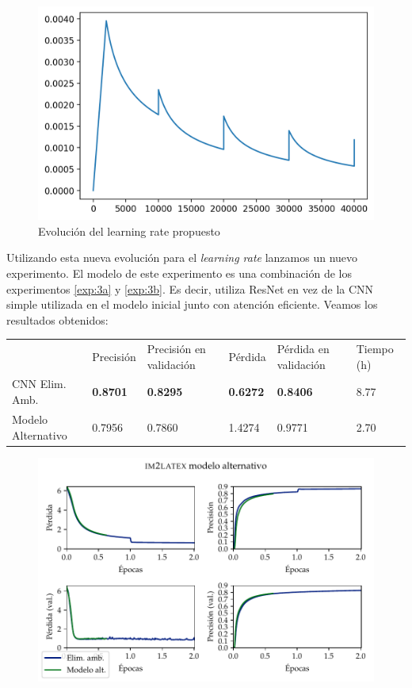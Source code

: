 \documentclass[a4paper, 20pt, dvipsnames]{article}
\begin{document}
\begin{figure}[H]
	\centering
	\includegraphics[scale=0.5]{fig/learning-rate2}
	\caption{Evolución del learning rate propuesto}
\end{figure}

Utilizando esta nueva evolución para el \emph{learning rate} lanzamos un nuevo
experimento. El modelo de este experimento es una combinación de los experimentos
\ref{exp:3a} y \ref{exp:3b}. Es decir, utiliza ResNet en vez de la CNN simple
utilizada en el modelo inicial junto con atención eficiente. Veamos los resultados
obtenidos:

\begin{table}[H]
	\centering
	\begin{tabular}{llllll}
		& Precisión       & Precisión en validación & Pérdida         & Pérdida en validación & Tiempo (h) \\ \cline{2-6} 
		CNN Elim. Amb.     & \textbf{0.8701} & \textbf{0.8295}         & \textbf{0.6272} & \textbf{0.8406}       & 8.77       \\
		Modelo Alternativo & 0.7956          & 0.7860                  & 1.4274          & 0.9771                & 2.70      
	\end{tabular}
\end{table}

\begin{figure}[H]
	\centering
	\includegraphics{fig/im2latex-alternativo}
\end{figure}
\end{document}
